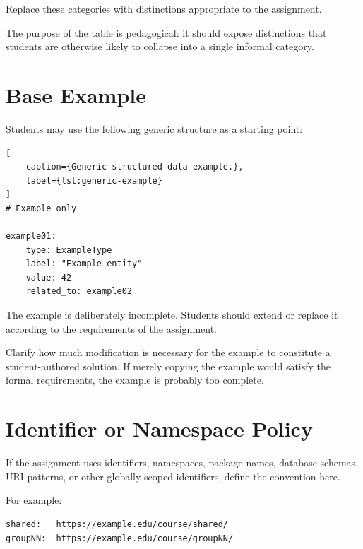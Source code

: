 \documentclass[11pt]{article}
\begin{document}
\begin{tutornote}
Replace these categories with distinctions appropriate to the assignment.

The purpose of the table is pedagogical: it should expose distinctions that
students are otherwise likely to collapse into a single informal category.
\end{tutornote}

\section{Base Example}

Students may use the following generic structure as a starting point:

\begin{lstlisting}[
    caption={Generic structured-data example.},
    label={lst:generic-example}
]
# Example only

example01:
    type: ExampleType
    label: "Example entity"
    value: 42
    related_to: example02
\end{lstlisting}

The example is deliberately incomplete. Students should extend or replace it
according to the requirements of the assignment.

\begin{tutornote}
Clarify how much modification is necessary for the example to constitute a
student-authored solution. If merely copying the example would satisfy the
formal requirements, the example is probably too complete.
\end{tutornote}

\section{Identifier or Namespace Policy}

If the assignment uses identifiers, namespaces, package names, database
schemas, URI patterns, or other globally scoped identifiers, define the
convention here.

For example:

\begin{lstlisting}[style=codesnippet]
shared:   https://example.edu/course/shared/
groupNN:  https://example.edu/course/groupNN/
\end{lstlisting}
\end{document}
